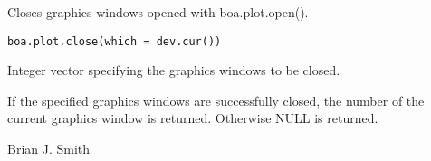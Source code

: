 \begin{Description}\relax
Closes graphics windows opened with boa.plot.open().
\end{Description}
\begin{Usage}
\begin{verbatim}
boa.plot.close(which = dev.cur())
\end{verbatim}
\end{Usage}
\begin{Arguments}
\begin{ldescription}
\item[\code{which}] Integer vector specifying the graphics windows to be closed.
\end{ldescription}
\end{Arguments}
\begin{Value}
If the specified graphics windows are successfully closed, the number of the 
current graphics window is returned. Otherwise NULL is returned.
\end{Value}
\begin{Author}\relax
Brian J. Smith
\end{Author}
\begin{SeeAlso}\relax
{}
\end{SeeAlso}

